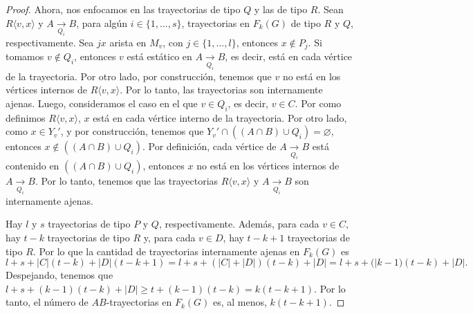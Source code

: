 \begin{proof}
    Ahora, nos enfocamos en las trayectorias de tipo $Q$ y las de tipo $R$. Sean
    $R\langle v,x \rangle$ y $A \xrightarrow[Q_i]{}  B$, para alg\'un $i \in
    \{1, \dots, s\}$, trayectorias en $F_k(G)$ de tipo $R$ y $Q$,
    respectivamente. Sea $jx$ arista en $M_v$, con $j \in \{1, \dots, l\}$,
    entonces $x \notin P_j$. Si tomamos $v \notin Q_i$, entonces $v$ est\'a
    est\'atico en $A \xrightarrow[Q_i]{} B$, es decir, est\'a en cada v\'ertice
    de la trayectoria. Por otro lado, por construcci\'on, tenemos que $v$ no
    est\'a en los v\'ertices internos de $R \langle v, x \rangle$. Por lo tanto,
    las trayectorias son internamente ajenas. Luego, consideramos el caso en el
    que $v \in Q_i$, es decir, $v \in C$. Por como definimos $R \langle v,x
    \rangle$, $x$ est\'a en cada v\'ertice interno de la trayectoria. Por otro
    lado, como $x \in Y_v'$, y por construcci\'on, tenemos que $Y_v ' \cap
    ((A\cap B) \cup Q_i) = \varnothing$, entonces $x \notin ((A \cap B) \cup
    Q_i)$. Por definici\'on, cada v\'ertice de $A \xrightarrow[Q_i]{}  B$ est\'a
    contenido en $((A \cap B) \cup Q_i)$, entonces $x$ no est\'a en los
    v\'ertices internos de $A \xrightarrow[Q_i]{} B$. Por lo tanto, tenemos que
    las trayectorias $R \langle v,x \rangle$ y $A \xrightarrow[Q_i]{}  B$ son
    internamente ajenas.

    Hay $l$ y $s$ trayectorias de tipo $P$ y $Q$, respectivamente. Adem\'as,
    para cada $v \in C$, hay $t-k$ trayectorias de tipo $R$ y, para cada $v \in
    D$, hay $t-k+1$ trayectorias de tipo $R$. Por lo que la cantidad de
    trayectorias internamente ajenas en $F_k(G)$ es
    \[
    l+ s+ |C|(t-k)+ |D|(t-k +1) = l + s + (|C| + |D|)(t-k) + |D|
    = l + s + (|k-1)(t-k) + |D|.
    \]
     Despejando, tenemos que $l + s + (k-1)(t-k) + |D| \geq t+ (k-1)(t-k) = k (t -k
    +1)$. Por lo tanto, el n\'umero de $AB$-trayectorias en $F_k(G)$ es, al
    menos, $k(t-k+1)$.

\end{proof}


